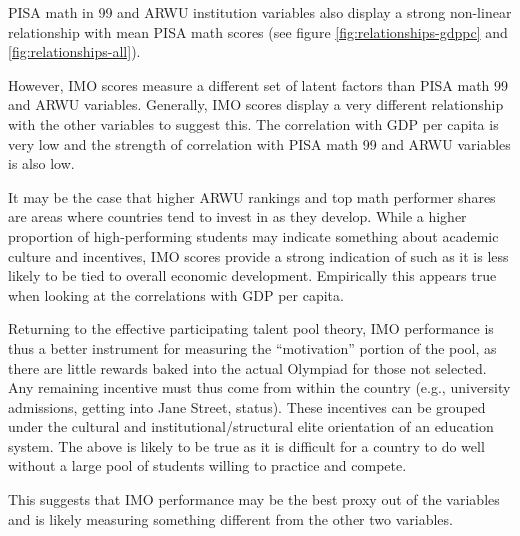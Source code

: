 \documentclass[11pt]{article}
\begin{document}
PISA math in 99 and ARWU institution variables also display a strong non-linear relationship with mean PISA math scores (see figure \ref{fig:relationships-gdppc} and \ref{fig:relationships-all}).

However, IMO scores measure a different set of latent factors than PISA math 99 and ARWU variables. Generally, IMO scores display a very different relationship with the other variables to suggest this. The correlation with GDP per capita is very low and the strength of correlation with PISA math 99 and ARWU variables is also low.

It may be the case that higher ARWU rankings and top math performer shares are areas where countries tend to invest in as they develop. While a higher proportion of high-performing students may indicate something about academic culture and incentives, IMO scores provide a strong indication of such as it is less likely to be tied to overall economic development. Empirically this appears true when looking at the correlations with GDP per capita.

Returning to the effective participating talent pool theory, IMO performance is thus a better instrument for measuring the “motivation” portion of the pool, as there are little rewards baked into the actual Olympiad for those not selected. Any remaining incentive must thus come from within the country (e.g., university admissions, getting into Jane Street, status). These incentives can be grouped under the cultural and institutional/structural elite orientation of an education system. The above is likely to be true as it is difficult for a country to do well without a large pool of students willing to practice and compete.

This suggests that IMO performance may be the best proxy out of the variables and is likely measuring something different from the other two variables.
\end{document}
